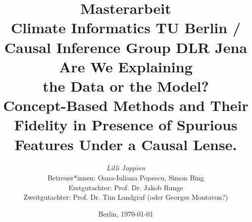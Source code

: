 %

\title{
{\small Masterarbeit}\\
{\small Climate Informatics TU Berlin / Causal Inference Group DLR Jena}\\
[7ex]
{Are We Explaining \\ the Data or the Model?} \\
[1ex]
{\LARGE Concept-Based Methods and
Their Fidelity in Presence of Spurious Features Under a Causal Lense.}}

\author{
{\emph{\normalsize Lilli Joppien}}\\
[18ex]   
{\normalsize Betreuer*innen: Oana-Iuliana Popescu, Simon Bing} \\
{\normalsize Erstgutachter: Prof. Dr. Jakob Runge} \\
{\normalsize Zweitgutachter: Prof. Dr. Tim Landgraf (oder Georges Montavon?) }}
\vspace{6ex}
\date{\normalsize Berlin, \today}
\maketitle

